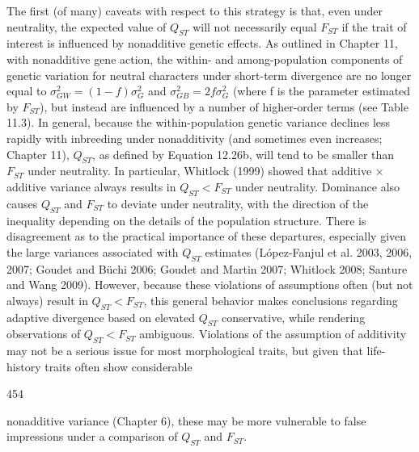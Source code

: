 \documentclass{article}
\begin{document}
The first (of many) caveats with respect to this strategy is that, even under neutrality, the expected value of  $ Q_{ST} $ will not necessarily equal  $ F_{ST} $ if the trait of interest is influenced by nonadditive genetic effects. As outlined in Chapter 11, with nonadditive gene action, the within- and among-population components of genetic variation for neutral characters under short-term divergence are no longer equal to  $ \sigma_{GW}^{2} = (1 - f)\sigma_{G}^{2} $ and  $ \sigma_{GB}^{2} = 2f\sigma_{G}^{2} $ (where f is the parameter estimated by  $ F_{ST} $), but instead are influenced by a number of higher-order terms (see Table 11.3). In general, because the within-population genetic variance declines less rapidly with inbreeding under nonadditivity (and sometimes even increases; Chapter 11),  $ Q_{ST} $, as defined by Equation 12.26b, will tend to be smaller than  $ F_{ST} $ under neutrality. In particular, Whitlock (1999) showed that additive × additive variance always results in  $ Q_{ST} < F_{ST} $ under neutrality. Dominance also causes  $ Q_{ST} $ and  $ F_{ST} $ to deviate under neutrality, with the direction of the inequality depending on the details of the population structure. There is disagreement as to the practical importance of these departures, especially given the large variances associated with  $ Q_{ST} $ estimates (López-Fanjul et al. 2003, 2006, 2007; Goudet and Büchi 2006; Goudet and Martin 2007; Whitlock 2008; Santure and Wang 2009). However, because these violations of assumptions often (but not always) result in  $ Q_{ST} < F_{ST} $, this general behavior makes conclusions regarding adaptive divergence based on elevated  $ Q_{ST} $ conservative, while rendering observations of  $ Q_{ST} < F_{ST} $ ambiguous. Violations of the assumption of additivity may not be a serious issue for most morphological traits, but given that life-history traits often show considerable

454

nonadditive variance (Chapter 6), these may be more vulnerable to false impressions under a comparison of  $ Q_{ST} $ and  $ F_{ST} $.
\end{document}
